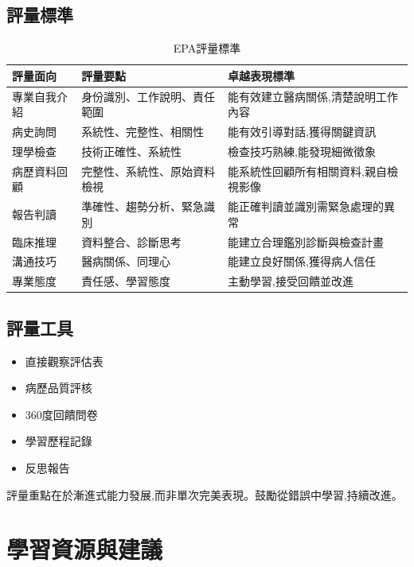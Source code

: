 \documentclass[12pt,a4paper]{article}
\newcommand{\note}[1]{
    \par
    \noindent
    \begin{tcolorbox}[
        colback=emergency_blue!5!white,
        colframe=emergency_blue,
        title=\textbf{重點提醒},
        fonttitle=\bfseries,
        boxrule=0.5pt,
        arc=3pt,
        left=6pt,
        right=6pt,
        top=6pt,
        bottom=6pt
    ]
    #1
    \end{tcolorbox}
}
\begin{document}
\subsection{評量標準}
\begin{table}[h]
    \centering
    \caption{EPA評量標準}
    \begin{tabular}{p{3cm} p{5cm} p{6cm}}
        \toprule
        \textbf{評量面向} & \textbf{評量要點} & \textbf{卓越表現標準} \\
        \midrule
        專業自我介紹 & 身份識別、工作說明、責任範圍 & 能有效建立醫病關係,清楚說明工作內容 \\
        病史詢問 & 系統性、完整性、相關性 & 能有效引導對話,獲得關鍵資訊 \\
        理學檢查 & 技術正確性、系統性 & 檢查技巧熟練,能發現細微徵象 \\
        病歷資料回顧 & 完整性、系統性、原始資料檢視 & 能系統性回顧所有相關資料,親自檢視影像 \\
        報告判讀 & 準確性、趨勢分析、緊急識別 & 能正確判讀並識別需緊急處理的異常 \\
        臨床推理 & 資料整合、診斷思考 & 能建立合理鑑別診斷與檢查計畫 \\
        溝通技巧 & 醫病關係、同理心 & 能建立良好關係,獲得病人信任 \\
        專業態度 & 責任感、學習態度 & 主動學習,接受回饋並改進 \\
        \bottomrule
    \end{tabular}
\end{table}

\subsection{評量工具}
\begin{itemize}[nosep]
    \item 直接觀察評估表
    \item 病歷品質評核
    \item 360度回饋問卷
    \item 學習歷程記錄
    \item 反思報告
\end{itemize}

\note{
評量重點在於漸進式能力發展,而非單次完美表現。鼓勵從錯誤中學習,持續改進。
}

\section{學習資源與建議}
\end{document}
